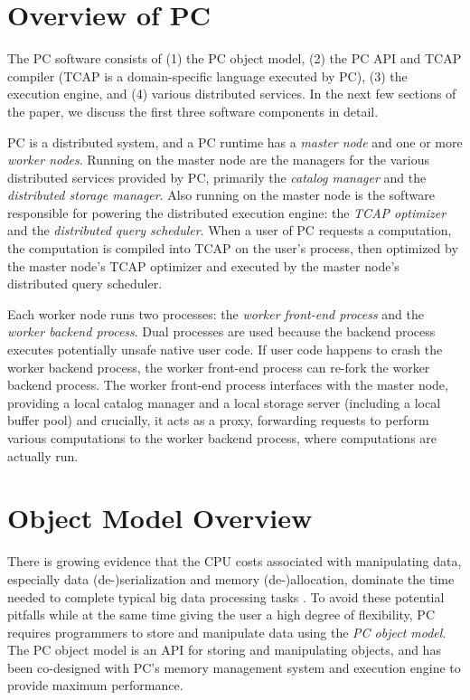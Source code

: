 
\section{Overview of PC}

The PC software consists of 
(1) the PC object model, (2) the PC API and TCAP compiler (TCAP is a domain-specific language executed by PC),
(3) the execution engine, and (4) various distributed services.  In the next few sections of the paper, 
we discuss the first three software components in detail.

PC is a distributed system, and a PC runtime has a \emph{master node} and one or more \emph{worker nodes}.
Running on the master node are the managers for the various distributed services provided by PC, primarily 
the \emph{catalog manager} and the \emph{distributed storage manager}.  Also running on the master
node is the software responsible for powering the distributed execution engine: the \emph{TCAP optimizer} and
the \emph{distributed query scheduler}.  
When a user of PC requests a computation, the computation is compiled into TCAP on the user's process, then optimized
by the master node's TCAP optimizer and executed by the master node's distributed query scheduler.

Each worker node runs two processes: the \emph{worker front-end process} and the \emph{worker backend process}.
Dual processes are used because the backend process
executes potentially unsafe native user code.
If
user code happens to crash the worker backend process, the worker 
front-end process can re-fork the worker
backend process.  
The worker front-end process interfaces with the master node, providing a local catalog manager and a local storage server (including
a local buffer pool)
and crucially, it acts as a proxy, forwarding requests to perform various computations to the worker backend process, where
computations are actually run.

\section{Object Model Overview}

There is growing evidence that the CPU costs associated with manipulating data, especially data (de-)serialization and memory 
(de-)allocation,  
dominate the time needed to complete typical big data processing tasks
\cite{ousterhout2015making, shi2015clash}.
To avoid these potential pitfalls while at the same time giving the user a high degree of flexibility,
PC requires programmers to store and manipulate data using the \emph{PC object model}.
The PC object model is an API for storing and manipulating objects, and has been co-designed with PC's memory management system and execution engine to provide
maximum performance.  

